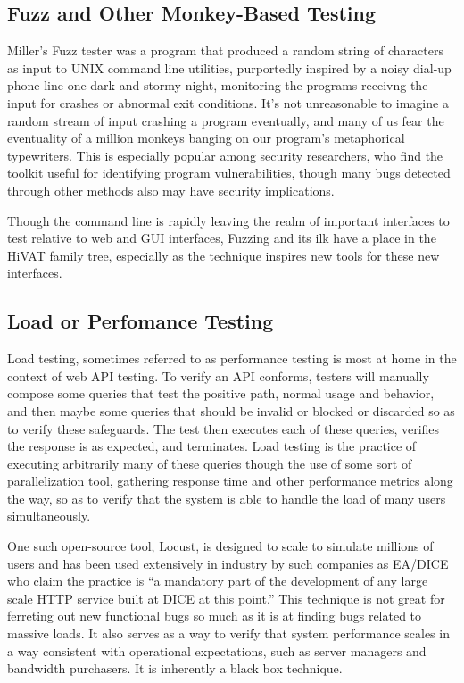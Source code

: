 \subsection{Fuzz and Other Monkey-Based Testing}
 Miller's Fuzz tester was a program that produced a random string of characters as input to UNIX command line utilities, purportedly inspired by a noisy dial-up phone line one dark and stormy night, monitoring the programs receivng the input for crashes or abnormal exit conditions. It's not unreasonable to imagine a random stream of input crashing a program eventually, and many of us fear the eventuality of a million monkeys banging on our program's metaphorical typewriters. This is especially popular among security researchers, who find the toolkit useful for identifying program vulnerabilities, though many bugs detected through other methods also may have security implications.

 Though the command line is rapidly leaving the realm of important interfaces to test relative to web and GUI interfaces, Fuzzing and its ilk have a place in the HiVAT family tree, especially as the technique inspires new tools for these new interfaces.

\subsection{Load or Perfomance Testing}
Load testing, sometimes referred to as performance testing is most at home in the context of web API testing. To verify an API conforms, testers will manually compose some queries that test the positive path, normal usage and behavior, and then maybe some queries that should be invalid or blocked or discarded so as to verify these safeguards. The test then executes each of these queries, verifies the response is as expected, and terminates. Load testing is the practice of executing arbitrarily many of these queries though the use of some sort of parallelization tool, gathering response time and other performance metrics along the way, so as to verify that the system is able to handle the load of many users simultaneously.

One such open-source tool, Locust\citep{heymanlocust}, is designed to scale to simulate millions of users and has been used extensively in industry by such companies as EA/DICE who claim the practice is ``a mandatory part of the development of any large scale HTTP service built at DICE at this point.'' This technique is not great for ferreting out new functional bugs so much as it is at finding bugs related to massive loads. It also serves as a way to verify that system performance scales in a way consistent with operational expectations, such as server managers and bandwidth purchasers. It is inherently a black box technique.

